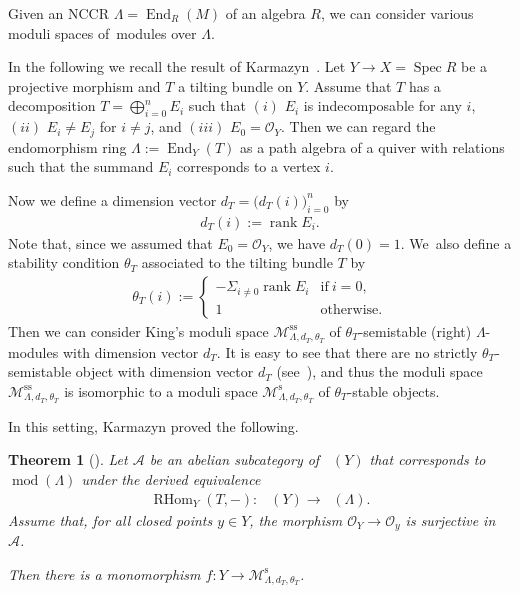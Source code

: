 \documentclass[pdftex]{sigma}
\DeclareMathOperator{\D}{D^b}
\DeclareMathOperator{\End}{End}
\DeclareMathOperator{\modu}{mod}
\DeclareMathOperator{\rank}{rank}
\DeclareMathOperator{\RHom}{RHom}
\DeclareMathOperator{\Spec}{Spec}
\newcommand{\stsh}{\mathcal{O}}
\numberwithin{equation}{section}
\newtheorem{Theorem}{Theorem}[section]
\begin{document}
Given an NCCR $\Lambda = \End_R(M)$ of an algebra $R$,
we can consider various moduli spaces of~modules over $\Lambda$.

In the following we recall the result of Karmazyn~\cite{Kar17}.
Let $Y \to X = \Spec R$ be a projective morphism and $T$ a tilting bundle on $Y$.
Assume that $T$ has a decomposition $T = \bigoplus_{i=0}^n E_i$
such that $(i)$ $E_i$ is indecomposable for any $i$, $(ii)$ $E_i \neq E_j$ for $i \neq j$, and $(iii)$ $E_0 = \stsh_Y$.
Then we can regard the endomorphism ring $\Lambda := \End_Y(T)$ as a path algebra of a quiver with relations
such that the summand $E_i$ corresponds to a vertex $i$.

Now we define a dimension vector $d_T = \big(d_T(i)\big)_{i = 0}^n$ by
\begin{gather*}
d_T(i) := \rank E_i.
\end{gather*}
Note that, since we assumed that $E_0 = \stsh_Y$, we have $d_T(0) = 1$.
We~also define a stability condition $\theta_T$ associated to the tilting bundle $T$ by
\begin{gather*}
\theta_T(i) := \begin{cases}
- \Sigma_{i \neq 0} \rank E_i & \text{if} \  i = 0, \\
1 & \text{otherwise.}
\end{cases}
\end{gather*}
Then we can consider King's moduli space $\mathcal{M}_{\Lambda, d_T, \theta_T}^{\mathrm{ss}}$
of $\theta_T$-semistable (right) $\Lambda$-modules with dimension vector $d_T$.
It is easy to see that there are no strictly $\theta_T$-semistable object with dimension vector $d_T$ (see~\cite{Kar17}),
and thus the moduli space $\mathcal{M}_{\Lambda, d_T, \theta_T}^{\mathrm{ss}}$ is isomorphic to a moduli space
$\mathcal{M}_{\Lambda, d_T, \theta_T}^{\mathrm{s}}$ of $\theta_T$-stable objects.

In this setting, Karmazyn proved the following.

\begin{Theorem}[{\cite[Corollary 5.1.5]{Kar17}}] \label{Karmazyn moduli}
Let $\mathcal{A}$ be an abelian subcategory of $\D(Y)$ that corresponds to $\modu(\Lambda)$ under the derived equivalence
\begin{gather*}
\RHom_Y(T,-)\colon \ \D(Y) \to \D(\Lambda).
\end{gather*}
Assume that, for all closed points $y \in Y$, the morphism $\stsh_Y \to \stsh_y$ is surjective in $\mathcal{A}$.

Then there is a monomorphism $f\colon Y \to \mathcal{M}_{\Lambda, d_T, \theta_T}^{\mathrm{s}}$.
\end{Theorem}
\end{document}
